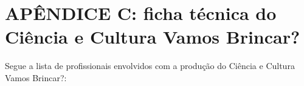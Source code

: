 \documentclass[
12pt,		%
openright,	%
twoside,  %
a4paper,			%
chapter=TITLE,		%
english,			%
french,				%
spanish,			%
brazil				%
]{USPSC-classe/USPSC}
\begin{document}
\chapter[AP\^ENDICE C: ficha t\'ecnica do \textquotedbl Ci\^encia e Cultura Vamos Brincar?\textquotedbl ]{AP\^ENDICE C: ficha t\'ecnica do \textquotedbl Ci\^encia e Cultura Vamos Brincar?\textquotedbl }\label{AP\^ENDICE C: ficha t\'ecnica do \textquotedbl Ci\^encia e Cultura Vamos Brincar?\textquotedbl }
Segue a lista de profissionais envolvidos com a produ\c{c}\~ao do \textquotedbl Ci\^encia e Cultura Vamos Brincar?\textquotedbl :
\end{document}

